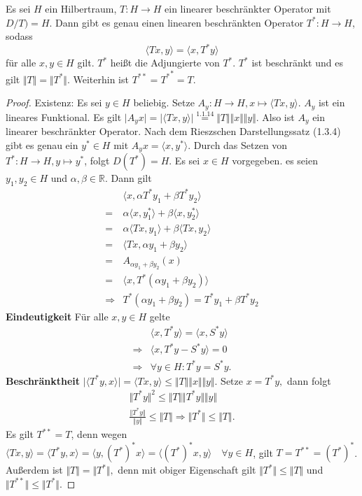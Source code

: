 \documentclass[12pt,titlepage]{article}
\numberwithin{equation}{section}
\begin{document}
Es sei $H$ ein Hilbertraum, $T:H\to H$ ein linearer beschränkter Operator mit $D/T)=H$. Dann gibt es genau einen linearen beschränkten Operator $T^*:H\to H $, sodass 
\[
\langle Tx, y\rangle= \langle x,T^*y \rangle 
\] für alle $x,y \in H$ gilt. $T^*$ heißt die Adjungierte von $T^*$. $T^*$ ist beschränkt und es gilt $\Vert T\Vert = \Vert T^* \Vert$. Weiterhin ist $T^{**}={T^*}^*=T$.
\begin{proof}
\item Existenz: Es sei $y \in H$ beliebig. Setze $A_y:H\to H,x \mapsto \langle Tx,y\rangle.$ $A_y$ ist ein lineares Funktional. Es gilt $\vert A_yx \vert = \vert \langle Tx,y\rangle \vert \overset{1.1.14}{=}\Vert T\Vert \Vert x\Vert \Vert y\Vert$. Also ist $A_y$ ein linearer beschränkter Operator. Nach dem Rieszschen Darstellungssatz (1.3.4) gibt es genau ein $y^* \in H$ mit $A_yx=\langle x,y^* \rangle$. Durch das Setzen von $T^*:H \to H, y \mapsto y^*$, folgt $D(T^*)=H.$ Es sei $x \in H$ vorgegeben. es seien $y_1,y_2\in H$ und $\alpha, \beta \in \mathbb{R}$. Dann gilt 
\begin{align*}
&\langle x,\alpha T^*y_1+ \beta T^*y_2 \rangle\\
=&\alpha\langle x,y_1^* \rangle+ \beta\langle x, y_2^* \rangle\\
=&\alpha\langle Tx ,y_1 \rangle + \beta \langle Tx,y_2 \rangle\\
=&\langle Tx ,\alpha y_1+\beta y_2 \rangle\\
=& A_{\alpha y_1+\beta y_2}(x)\\
=& \langle x, T^*(\alpha y_1+\beta y_2) \rangle\\
\Rightarrow &  T^*(\alpha y_1+\beta y_2)=T^*y_1+ \beta T^*y_2
\end{align*}
\textbf{Eindeutigkeit} Für alle $x,y \in H$ gelte 
\begin{align*}
&\langle x,T^*y\rangle =\langle x, S^*y \rangle\\
\Rightarrow &\langle x, T^*y-S^*y \rangle=0\\
\Rightarrow &\forall y \in H: T^*y=S^*y.
\end{align*}
\textbf{Beschränktheit} $\vert \langle T^*y,x\rangle\vert =\langle Tx, y \rangle \leq \Vert T \Vert \Vert x \Vert \Vert y\Vert. $ Setze $x=T^*y, $ dann folgt 
\begin{align*}
\Vert T^*y\Vert^2 \leq \Vert T \Vert \Vert T^*y\Vert \Vert y\Vert \\
\frac{\Vert T^*y\Vert}{\Vert y \Vert }\leq \Vert T \Vert \Rightarrow \Vert T^* \Vert \leq \Vert T \Vert.  
\end{align*}
Es gilt $T^{**}=T$, denn wegen $\langle Tx, y\rangle=\langle T^*y,x \rangle= \langle y , (T^*)^*x \rangle= \langle (T^*)^*x,y \rangle \quad \forall y \in H$, gilt $T=T^{**}=(T^*)^*$.\\
Außerdem ist $\Vert T \Vert = \Vert T^* \Vert,$
denn mit obiger Eigenschaft gilt $\Vert T^*\Vert  \leq \Vert T \Vert $ und $\Vert T^{**}\Vert  \leq \Vert T^* \Vert $.
\end{proof}
\end{document}
